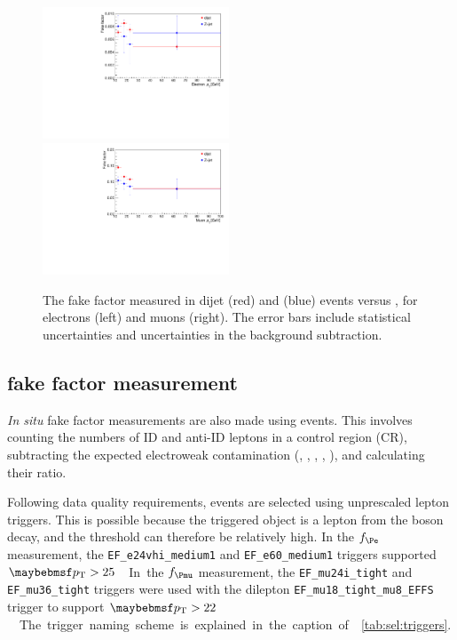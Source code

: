 \begin{figure}
	\includegraphics[width=0.495\textwidth]{custom_images/wjets/ff_el_data}
	\hfill
	\includegraphics[width=0.495\textwidth]{custom_images/wjets/ff_mu_data}
	\caption{The fake factor measured in dijet (red) and \Zjets (blue) events versus \pt, 
	for electrons (left) and muons (right). The error bars include statistical 
	uncertainties and uncertainties in the background subtraction.}
	\label{fig:wjets:ff_data}
\end{figure}



\subsection{\Zjets fake factor measurement}
\label{sec:wjets:zjet_ff}

\textit{In situ} fake factor measurements are also made using \Zjets events. This 
involves counting the numbers of ID and anti-ID leptons in a \Zjets control region (CR), 
subtracting the expected electroweak contamination (\Zgamma, \ZZ, \Zgstar, \WZ, \Wgstar), 
and calculating their ratio.

Following data quality requirements, events are selected using unprescaled lepton 
triggers. This is possible because the triggered object is a lepton from the \PZ boson 
decay, and the \pt threshold can therefore be relatively high. In the $f_{\Pe}$ 
measurement, the \verb|EF_e24vhi_medium1| and \verb|EF_e60_medium1| triggers supported 
\unit{$\pt > 25$}{\GeV}. In the $f_{\Pmu}$ measurement, the \verb|EF_mu24i_tight| and 
\verb|EF_mu36_tight| triggers were used with the dilepton \verb|EF_mu18_tight_mu8_EFFS| 
trigger to support \unit{$\pt > 22$}{\GeV}. The trigger naming scheme is explained in the 
caption of \Table~\ref{tab:sel:triggers}.

